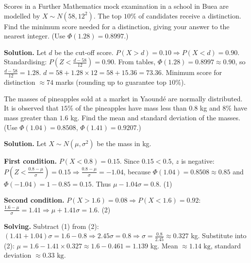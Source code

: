\documentclass[11pt]{article}
\begin{document}
\begin{exemplebox}
Scores in a Further Mathematics mock examination in a school in Buea are modelled by $X \sim N(58, 12^{2})$. The top $10\%$ of candidates receive a distinction. Find the minimum score needed for a distinction, giving your answer to the nearest integer.
(Use $\Phi(1.28) = 0.8997$.)
\end{exemplebox}

\begin{exoresolu}
\textbf{Solution.} Let $d$ be the cut-off score. $P(X > d) = 0.10 \Rightarrow P(X < d) = 0.90$.
Standardising: $P\!\left(Z < \frac{d-58}{12}\right) = 0.90$.
From tables, $\Phi(1.28) = 0.8997 \approx 0.90$, so $\frac{d-58}{12} = 1.28$.
$d = 58 + 1.28 \times 12 = 58 + 15.36 = 73.36$.
Minimum score for distinction $\approx \boxed{74}$ marks (rounding up to guarantee top $10\%$).
\end{exoresolu}

\begin{exemplebox}
The masses of pineapples sold at a market in Yaoundé are normally distributed. It is observed that $15\%$ of the pineapples have mass less than $0.8$ kg and $8\%$ have mass greater than $1.6$ kg. Find the mean and standard deviation of the masses.
(Use $\Phi(1.04) = 0.8508$, $\Phi(1.41) = 0.9207$.)
\end{exemplebox}

\begin{exoresolu}
\textbf{Solution.} Let $X \sim N(\mu, \sigma^{2})$ be the mass in kg.

\textbf{First condition.} $P(X < 0.8) = 0.15$. Since $0.15 < 0.5$, $z$ is negative:
$P\!\left(Z < \frac{0.8-\mu}{\sigma}\right) = 0.15 \Rightarrow \frac{0.8-\mu}{\sigma} = -1.04$,
because $\Phi(1.04) = 0.8508 \approx 0.85$ and $\Phi(-1.04) = 1 - 0.85 = 0.15$.
Thus $\mu - 1.04\sigma = 0.8$. \quad (1)

\textbf{Second condition.} $P(X > 1.6) = 0.08 \Rightarrow P(X < 1.6) = 0.92$:
$\frac{1.6-\mu}{\sigma} = 1.41 \Rightarrow \mu + 1.41\sigma = 1.6$. \quad (2)

\textbf{Solving.} Subtract (1) from (2):
$(1.41 + 1.04)\sigma = 1.6 - 0.8 \Rightarrow 2.45\sigma = 0.8 \Rightarrow \sigma = \frac{0.8}{2.45} \approx 0.327$ kg.
Substitute into (2): $\mu = 1.6 - 1.41 \times 0.327 \approx 1.6 - 0.461 = 1.139$ kg.
Mean $\approx \boxed{1.14 \text{ kg}}$, standard deviation $\approx \boxed{0.33 \text{ kg}}$.
\end{exoresolu}
\end{document}
